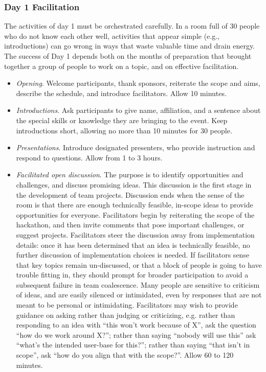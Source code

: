 \documentclass[letterpaper,11pt]{texMemo}
\begin{document}
\subsubsection*{Day 1 Facilitation} The activities of day 1 must be orchestrated carefully. In a room full of 30 people who do not know each other well, activities that appear simple (e.g., introductions) can go wrong in ways that waste valuable time and drain energy. The success of Day 1 depends both on the months of preparation that brought together a group of people to work on a topic, and on effective facilitation. 
\begin{itemize}
\item	{\em Opening}. Welcome participants, thank sponsors, reiterate the scope and aims, describe the schedule, and introduce facilitators. Allow 10 minutes.
\item	{\em Introductions}. Ask participants to give name, affiliation, and a sentence about the special skills or knowledge they are bringing to the event. Keep introductions short, allowing no more than 10 minutes for 30 people. 
\item	{\em Presentations}. Introduce designated presenters, who provide instruction and respond to questions. Allow from 1 to 3 hours.  
\item	{\em Facilitated open discussion}. The purpose is to identify opportunities and challenges, and discuss promising ideas. This discussion is the first stage in the development of team projects. Discussion ends when the sense of the room is that there are enough technically feasible, in-scope ideas to provide opportunities for everyone. Facilitators begin by reiterating the scope of the hackathon, and then invite comments that pose important challenges, or suggest projects. Facilitators steer the discussion away from implementation details: once it has been determined that an idea is technically feasible, no further discussion of implementation choices is needed. If facilitators sense that key topics remain un-discussed, or that a block of people is going to have trouble fitting in, they should prompt for broader participation to avoid a subsequent failure in team coalescence. Many people are sensitive to criticism of ideas, and are easily silenced or intimidated, even by responses that are not meant to be personal or intimidating. Facilitators may wish to provide guidance on asking rather than judging or criticizing, e.g. rather than responding to an idea with “this won’t work because of X”, ask the question “how do we work around X?”; rather than saying “nobody will use this” ask “what’s the intended user-base for this?”; rather than saying “that isn’t in scope”, ask “how do you align that with the scope?”.  Allow 60 to 120 minutes.  

\end{itemize}
\end{document}
